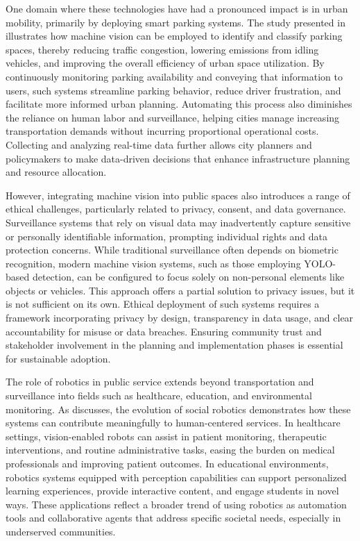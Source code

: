 \documentclass[conference]{IEEEtran}
\begin{document}
One domain where these technologies have had a pronounced impact is in urban mobility, 
primarily by deploying smart parking systems. 
The study presented in \cite{smart_parking} 
illustrates how machine vision can be employed to identify and classify parking spaces, 
thereby reducing traffic congestion, 
lowering emissions from idling vehicles, 
and improving the overall efficiency of urban space utilization. 
By continuously monitoring parking availability and conveying that information to users, 
such systems streamline parking behavior, 
reduce driver frustration, 
and facilitate more informed urban planning. 
Automating this process also diminishes the reliance on human labor and surveillance, 
helping cities manage increasing transportation demands without incurring proportional operational costs. 
Collecting and analyzing real-time data further allows city planners and policymakers to make data-driven decisions that enhance infrastructure planning and resource allocation.

However, 
integrating machine vision into public spaces also introduces a range of ethical challenges, 
particularly related to privacy, 
consent, 
and data governance. 
Surveillance systems that rely on visual data may inadvertently capture sensitive or personally identifiable information, 
prompting individual rights and data protection concerns. 
While traditional surveillance often depends on biometric recognition, 
modern machine vision systems, 
such as those employing YOLO-based detection, 
can be configured to focus solely on non-personal elements like objects or vehicles. 
This approach offers a partial solution to privacy issues, 
but it is not sufficient on its own. 
Ethical deployment of such systems requires a framework incorporating privacy by design, 
transparency in data usage, 
and clear accountability for misuse or data breaches. 
Ensuring community trust and stakeholder involvement in the planning and implementation phases is essential for sustainable adoption.

The role of robotics in public service extends beyond transportation and surveillance into fields such as healthcare, 
education, 
and environmental monitoring. 
As \cite{social_robotics} discusses, 
the evolution of social robotics demonstrates how these systems can contribute meaningfully to human-centered services. 
In healthcare settings, 
vision-enabled robots can assist in patient monitoring, 
therapeutic interventions, 
and routine administrative tasks, 
easing the burden on medical professionals and improving patient outcomes. 
In educational environments, 
robotics systems equipped with perception capabilities can support personalized learning experiences, 
provide interactive content, 
and engage students in novel ways. 
These applications reflect a broader trend of using robotics as automation tools and collaborative agents that address specific societal needs, especially in underserved communities.
\end{document}
